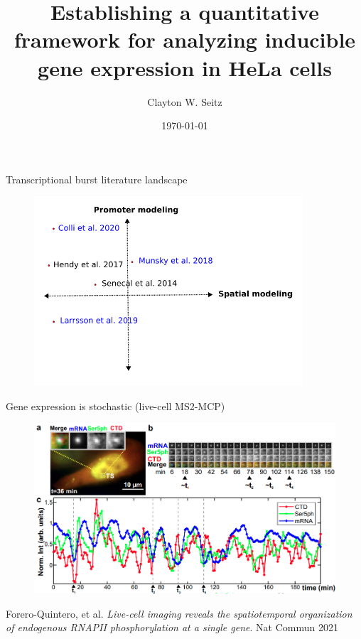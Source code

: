 \documentclass[aspectratio=1610]{beamer}					%
\title{Establishing a quantitative framework for analyzing inducible gene expression in HeLa cells}	%
\author{Clayton W. Seitz}								%
\date{\today}									%
\begin{document}
\begin{frame}
  \titlepage
\end{frame}


%

\begin{frame}{Transcriptional burst literature landscape}


\begin{figure}
\includegraphics[width=10cm]{lit.png}
\end{figure}

\end{frame}


\begin{frame}{Gene expression is stochastic (live-cell MS2-MCP)}
\begin{figure}
\includegraphics[width=12cm]{live-cell.png}
\end{figure}
{\tiny Forero-Quintero, et al. \textit{Live-cell imaging reveals the spatiotemporal organization of endogenous RNAPII phosphorylation at a single gene}. Nat Commun 2021}\\
\end{frame}
\end{document}
